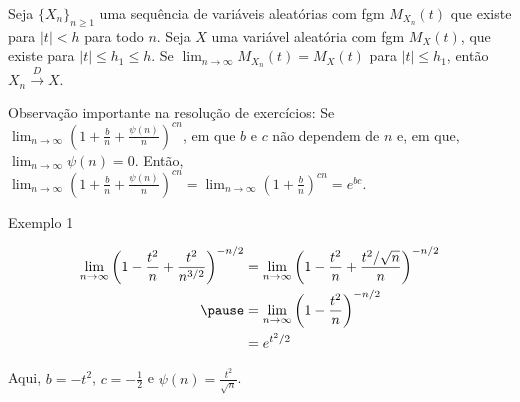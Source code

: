 \documentclass[12pt]{beamer}
\begin{document}
\begin{frame}{}
	\begin{Teorema}
		\justifying
		Seja $\{X_{n}\}_{n\geq 1}$ uma sequência de variáveis aleatórias com fgm $M_{X_n}(t)$ que existe para $|t|<h$ para todo $n$. Seja $X$ uma variável aleatória com fgm $M_{X}(t)$, que existe para $|t| \leq h_1 \leq h$. Se $\lim_{n \to \infty} M_{X_n}(t) = M_{X}(t)$ para $|t| \leq h_1$, então $X_{n} \overset{D}{\rightarrow} X.$
	\end{Teorema}
	\pause
	\begin{block}{Observação importante na resolução de exercícios:}
		\justifying
		Se ${\displaystyle \lim_{n \to \infty} \left(1 + \frac{b}{n} + \frac{\psi(n)}{n}\right)^{cn}}$, em que $b$ e $c$ não dependem de $n$ e, em que, ${\displaystyle\lim_{n \to \infty} \psi(n) = 0}$. Então,
		${\displaystyle \lim_{n \to \infty} \left(1 + \frac{b}{n} + \frac{\psi(n)}{n}\right)^{cn} = \lim_{n \to \infty} \left(1 + \frac{b}{n}\right)^{cn} = e^{bc}}.$
	\end{block}
\end{frame}

\begin{frame}{Exemplo 1}
	\begin{block}{}
		\justifying
		
		\begin{align*}
			{\displaystyle \lim_{{n \to \infty}} \left(1 - \frac{{t^2}}{{n}} + \frac{{t^2}}{{n^{3/2}}}\right)^{-n/2}} &= {\displaystyle \lim_{{n \to \infty}} \left(1 - \frac{{t^2}}{{n}} + \frac{{t^2}/\sqrt{n}}{{n}}\right)^{-n/2}}\\ \pause
			&={\displaystyle \lim_{{n \to \infty}} \left(1 - \frac{{t^2}}{{n}}\right)^{-n/2}}\\
			&= e^{t^2/2}
		\end{align*}
		
		
		Aqui, $b = -t^2$, $c = -\frac{1}{2}$ e $\psi(n) = \frac{{t^2}}{{\sqrt{n}}}$. %
	\end{block}
\end{frame}
\end{document}
